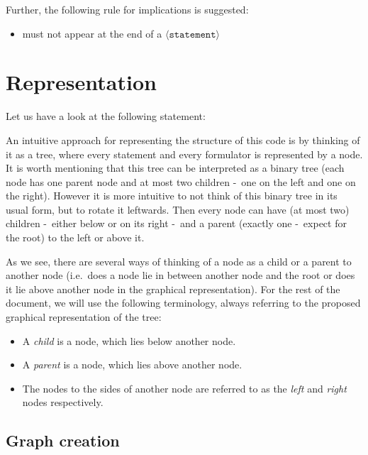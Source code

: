 \documentclass[british]{article}
\newenvironment{code}{\captionsetup{type=listing, skip=0pt}}{}
\newcommand\m[1]{\pcode{\texttt{#1}}}
\newcommand\sourcecode[1]{%
	\begin{code}
		\begin{tcolorbox}[breakable, left=7mm, colbacktitle=manatee,%
			title=\captionof{listing}{\texttt{examples/#1.prove}}\label{code:#1}]
			\VerbatimInput[obeytabs, numbers=left]{examples/#1.prove}%
	\end{tcolorbox}%
	\end{code}
}
\begin{document}
Further, the following rule for implications is suggested:

\begin{itemize}
\item \m{=>} must not appear at the end of a $\langle\texttt{statement}\rangle$
\end{itemize}
\pagebreak{}

\section{Representation}

Let us have a look at the following statement:
\newline

\sourcecode{exmp1}

An intuitive approach for representing the structure of this code is by thinking
of it as a tree, where every statement and every formulator is represented by a
node. It is worth mentioning that this tree can be interpreted as a binary tree
(each node has one parent node and at most two children -\ one on the left and
one on the right). However it is more intuitive to not think of this binary tree
in its usual form, but to rotate it leftwards. Then every node can have (at most
two) children -\ either below or on its right -\ and a parent (exactly one -\
expect for the root) to the left or above it.

As we see, there are several ways of thinking of a node as a child or a parent
to another node (i.e.\ does a node lie in between another node and the root or
does it lie above another node in the graphical representation). For the rest of
the document, we will use the following terminology, always referring to the
proposed graphical representation of the tree:

\begin{itemize}
	\item
		A \emph{child} is a node, which lies below another node.
	\item
		A \emph{parent} is a node, which lies above another node.
	\item
		The nodes to the sides of another node are referred to as the
		\emph{left} and \emph{right} nodes respectively.
\end{itemize}

\subsection{Graph creation}\label{sec:creation}
\end{document}
